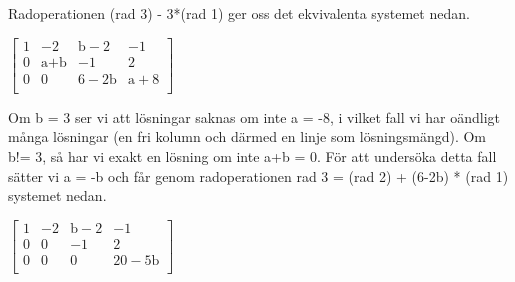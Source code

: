 Radoperationen (rad 3) - 3*(rad 1) ger oss det ekvivalenta systemet nedan.


$\begin{bmatrix}1&-2&\text{b}-2&-1\\0&\text{a+b}&-1&2\\0&0&6-2\text{b}&\text{a}+8\\ \end{bmatrix}$

Om b = 3 ser vi att lösningar saknas om inte a = -8, i vilket fall vi har oändligt många lösningar (en fri kolumn och därmed en linje som lösningsmängd). Om b!= 3, så har vi exakt en lösning om inte a+b = 0. För att undersöka detta fall sätter vi a = -b och får genom radoperationen rad 3 = (rad 2) + (6-2b) * (rad 1) systemet nedan.

$\begin{bmatrix}1&-2&\text{b}-2&-1\\0&0&-1&2\\0&0&0&20-5\text{b}\\ \end{bmatrix}$